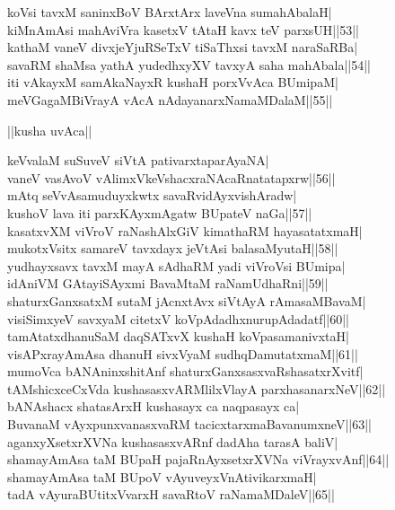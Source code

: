\documentclass{article}
\begin{document}
koVsi tavxM saninxBoV BArxtArx laveVna sumahAbalaH|\\
kiMnAmAsi mahAviVra kasetxV tAtaH kavx teV parxsUH||53||\\
kathaM vaneV divxjeYjuRSeTxV tiSaThxsi tavxM naraSaRBa|\\
savaRM shaMsa yathA yudedhxyXV tavxyA saha mahAbala||54||\\
iti vAkayxM samAkaNayxR kushaH porxVvAca BUmipaM|\\
meVGagaMBiVrayA vAcA nAdayanarxNamaMDalaM||55||\\

\begin{center}
||kusha uvAca||
\end{center}

keVvalaM suSuveV siVtA pativarxtaparAyaNA|\\
vaneV vasAvoV vAlimxVkeVshacxraNAcaRnatatapxrw||56||\\
mAtq seVvAsamuduyxkwtx savaRvidAyxvishAradw|\\
kushoV lava iti parxKAyxmAgatw BUpateV naGa||57||\\
kasatxvXM viVroV raNashAlxGiV kimathaRM hayasatatxmaH|\\
mukotxVsitx samareV tavxdayx jeVtAsi balasaMyutaH||58||\\
yudhayxsavx tavxM mayA sAdhaRM yadi viVroVsi BUmipa|\\
idAniVM GAtayiSAyxmi BavaMtaM raNamUdhaRni||59||\\
shaturxGanxsatxM sutaM jAcnxtAvx siVtAyA rAmasaMBavaM|\\
visiSimxyeV savxyaM citetxV koVpAdadhxnurupAdadatf||60||\\
tamAtatxdhanuSaM daqSATxvX kushaH koVpasamanivxtaH|\\
visAPxrayAmAsa dhanuH sivxVyaM sudhqDamutatxmaM||61||\\
mumoVca bANAninxshitAnf shaturxGanxsasxvaRshasatxrXvitf|\\
tAMshicxceCxVda kushasasxvARMlilxVlayA parxhasanarxNeV||62||\\
bANAshacx shatasArxH kushasayx ca naqpasayx ca|\\
BuvanaM vAyxpunxvanasxvaRM tacicxtarxmaBavanumxneV||63||\\
aganxyXsetxrXVNa kushasasxvARnf dadAha tarasA baliV|\\
shamayAmAsa taM BUpaH pajaRnAyxsetxrXVNa viVrayxvAnf||64||\\
shamayAmAsa taM BUpoV vAyuveyxVnAtivikarxmaH|\\
tadA vAyuraBUtitxVvarxH savaRtoV raNamaMDaleV||65||\\
\end{document}
